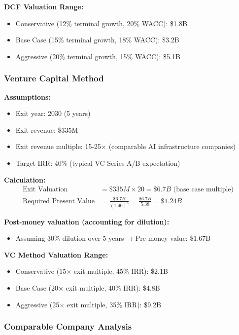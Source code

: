 \documentclass[11pt,letterpaper]{article}
\begin{document}
\textbf{DCF Valuation Range:}
\begin{itemize}
    \item Conservative (12\% terminal growth, 20\% WACC): \$1.8B
    \item Base Case (15\% terminal growth, 18\% WACC): \$3.2B
    \item Aggressive (20\% terminal growth, 15\% WACC): \$5.1B
\end{itemize}

\subsubsection{Venture Capital Method}

\textbf{Assumptions:}
\begin{itemize}
    \item Exit year: 2030 (5 years)
    \item Exit revenue: \$335M
    \item Exit revenue multiple: 15-25× (comparable AI infrastructure companies)
    \item Target IRR: 40\% (typical VC Series A/B expectation)
\end{itemize}

\textbf{Calculation:}
\begin{align*}
\text{Exit Valuation} &= \$335M \times 20 = \$6.7B \text{ (base case multiple)} \\
\text{Required Present Value} &= \frac{\$6.7B}{(1.40)^5} = \frac{\$6.7B}{5.38} = \$1.24B
\end{align*}

\textbf{Post-money valuation (accounting for dilution):}
\begin{itemize}
    \item Assuming 30\% dilution over 5 years → Pre-money value: \$1.67B
\end{itemize}

\textbf{VC Method Valuation Range:}
\begin{itemize}
    \item Conservative (15× exit multiple, 45\% IRR): \$2.1B
    \item Base Case (20× exit multiple, 40\% IRR): \$4.8B
    \item Aggressive (25× exit multiple, 35\% IRR): \$9.2B
\end{itemize}

\subsubsection{Comparable Company Analysis}
\end{document}
